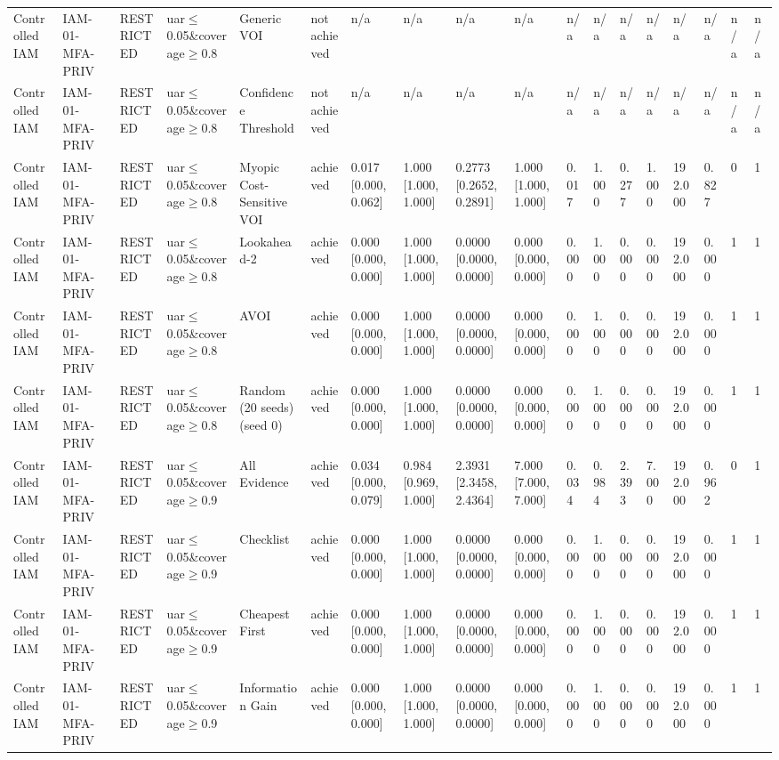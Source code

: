 \begin{table}[!ht]
{\begin{tabular}{llllllllllllllllll}
Controlled IAM & IAM-01-MFA-PRIV & RESTRICTED & uar$\le$0.05\&coverage$\ge$0.8 & Generic VOI & not achieved & n/a & n/a & n/a & n/a & n/a & n/a & n/a & n/a & n/a & n/a & n/a & n/a \\
Controlled IAM & IAM-01-MFA-PRIV & RESTRICTED & uar$\le$0.05\&coverage$\ge$0.8 & Confidence Threshold & not achieved & n/a & n/a & n/a & n/a & n/a & n/a & n/a & n/a & n/a & n/a & n/a & n/a \\
Controlled IAM & IAM-01-MFA-PRIV & RESTRICTED & uar$\le$0.05\&coverage$\ge$0.8 & Myopic Cost-Sensitive VOI & achieved & 0.017 [0.000, 0.062] & 1.000 [1.000, 1.000] & 0.2773 [0.2652, 0.2891] & 1.000 [1.000, 1.000] & 0.017 & 1.000 & 0.277 & 1.000 & 192.000 & 0.827 & 0 & 1 \\
Controlled IAM & IAM-01-MFA-PRIV & RESTRICTED & uar$\le$0.05\&coverage$\ge$0.8 & Lookahead-2 & achieved & 0.000 [0.000, 0.000] & 1.000 [1.000, 1.000] & 0.0000 [0.0000, 0.0000] & 0.000 [0.000, 0.000] & 0.000 & 1.000 & 0.000 & 0.000 & 192.000 & 0.000 & 1 & 1 \\
Controlled IAM & IAM-01-MFA-PRIV & RESTRICTED & uar$\le$0.05\&coverage$\ge$0.8 & AVOI & achieved & 0.000 [0.000, 0.000] & 1.000 [1.000, 1.000] & 0.0000 [0.0000, 0.0000] & 0.000 [0.000, 0.000] & 0.000 & 1.000 & 0.000 & 0.000 & 192.000 & 0.000 & 1 & 1 \\
Controlled IAM & IAM-01-MFA-PRIV & RESTRICTED & uar$\le$0.05\&coverage$\ge$0.8 & Random (20 seeds) (seed 0) & achieved & 0.000 [0.000, 0.000] & 1.000 [1.000, 1.000] & 0.0000 [0.0000, 0.0000] & 0.000 [0.000, 0.000] & 0.000 & 1.000 & 0.000 & 0.000 & 192.000 & 0.000 & 1 & 1 \\
Controlled IAM & IAM-01-MFA-PRIV & RESTRICTED & uar$\le$0.05\&coverage$\ge$0.9 & All Evidence & achieved & 0.034 [0.000, 0.079] & 0.984 [0.969, 1.000] & 2.3931 [2.3458, 2.4364] & 7.000 [7.000, 7.000] & 0.034 & 0.984 & 2.393 & 7.000 & 192.000 & 0.962 & 0 & 1 \\
Controlled IAM & IAM-01-MFA-PRIV & RESTRICTED & uar$\le$0.05\&coverage$\ge$0.9 & Checklist & achieved & 0.000 [0.000, 0.000] & 1.000 [1.000, 1.000] & 0.0000 [0.0000, 0.0000] & 0.000 [0.000, 0.000] & 0.000 & 1.000 & 0.000 & 0.000 & 192.000 & 0.000 & 1 & 1 \\
Controlled IAM & IAM-01-MFA-PRIV & RESTRICTED & uar$\le$0.05\&coverage$\ge$0.9 & Cheapest First & achieved & 0.000 [0.000, 0.000] & 1.000 [1.000, 1.000] & 0.0000 [0.0000, 0.0000] & 0.000 [0.000, 0.000] & 0.000 & 1.000 & 0.000 & 0.000 & 192.000 & 0.000 & 1 & 1 \\
Controlled IAM & IAM-01-MFA-PRIV & RESTRICTED & uar$\le$0.05\&coverage$\ge$0.9 & Information Gain & achieved & 0.000 [0.000, 0.000] & 1.000 [1.000, 1.000] & 0.0000 [0.0000, 0.0000] & 0.000 [0.000, 0.000] & 0.000 & 1.000 & 0.000 & 0.000 & 192.000 & 0.000 & 1 & 1 \\

\end{tabular}}
\end{table}
